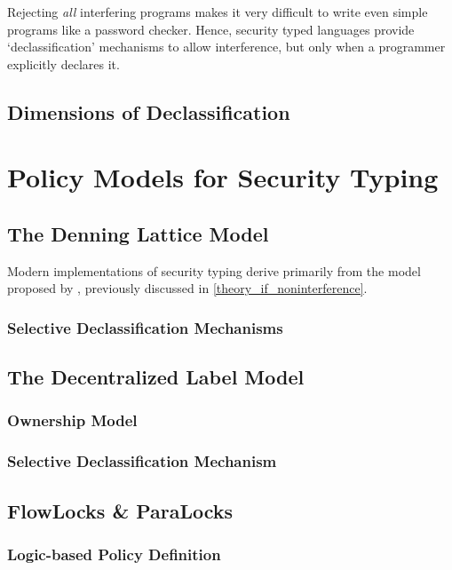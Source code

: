 Rejecting \textit{all} interfering programs makes it very difficult to write even simple programs like a password checker. Hence, security typed languages provide `declassification' mechanisms to allow interference, but only when a programmer explicitly declares it.

\subsection{Dimensions of Declassification}

\cite{sabelfeld2004model}

\section{Policy Models for Security Typing}

\subsection{The Denning Lattice Model}

Modern implementations of security typing derive primarily from the model proposed by \citeauthor{denning1977certification} \cite{denning1977certification}, previously discussed in \ref{theory_if_noninterference}.

\subsubsection{Selective Declassification Mechanisms}

\subsection{The Decentralized Label Model}

\subsubsection{Ownership Model}

\subsubsection{Selective Declassification Mechanism}

\subsection{FlowLocks \& ParaLocks}

\subsubsection{Logic-based Policy Definition}

